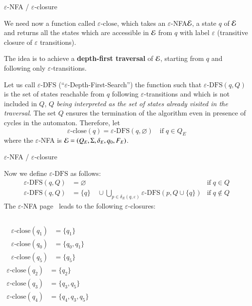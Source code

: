 \documentclass[compress,dvips,xcolor={dvipsnames},t]{beamer}
\newcommand\eNFA{\(\varepsilon\)-NFA\xspace}
\newcommand\eClose{\varepsilon\text{-close}}
\newcommand\eDFS{\varepsilon\text{-DFS}}
\begin{document}
%
\begin{frame}{\eNFA{} / \(\varepsilon\)-closure}

We need now a function called \textbf{\(\eClose\)}, which takes an
\eNFA \(\cal E\), a state \(q\) of \(\cal E\) and returns all the
states which are accessible in \(\cal E\) from \(q\) with label
\(\varepsilon\) (transitive closure of \(\varepsilon\) transitions).

\bigskip

The idea is to achieve a \textbf{depth-first traversal} of \(\cal E\),
starting from \(q\) and following only \(\varepsilon\)-transitions.

\bigskip

Let us call \(\eDFS\) (``\(\varepsilon\)-Depth-First-Search'') the
function such that \(\eDFS(q, Q)\) is the set of states reachable from
\(q\) following \(\varepsilon\)-transitions and which is not included in
\(Q\), \emph{\(Q\) being interpreted as the set of states already
  visited in the traversal}. The set \(Q\) ensures the termination of
the algorithm even in presence of cycles in the automaton. Therefore,
let
\[
\eClose (q) = \eDFS (q, \varnothing) \quad \text{if} \; q \in Q_E
\]
where the \eNFA is \({\cal E} = (Q_E, \Sigma, \delta_E, q_0, F_E)\).

\end{frame}

%
\begin{frame}{\eNFA{} / \(\varepsilon\)-closure}

Now we define \(\eDFS\) as follows:
\begin{align}
   \eDFS (q, Q)
&= \varnothing
& \text{if} \; q \in Q \label{eDFS_1}\\
  \eDFS (q, Q)
&= \{q\} \quad \cup \bigcup_{p \in \delta_E(q,\varepsilon)}{\eDFS (p, Q
    \cup \{q\})}
& \text{if} \; q \not\in Q \label{eDFS_2}
\end{align}
The \eNFA page~\pageref{enfa_num} leads to the
following \(\varepsilon\)-closures:

\bigskip

\begin{columns}
    \begin{align*}
      \eClose (q_1) &= \{q_1\}\\
      \eClose (q_0) &= \{q_0, q_1\}\\
      \eClose (q_5) &= \{q_5\}
    \end{align*}
  \begin{align*}
    \eClose (q_2) &= \{q_2\}\\
    \eClose (q_3) &= \{q_3, q_5\}\\
    \eClose (q_4) &= \{q_4, q_3, q_5\}
  \end{align*}
\end{columns}

\end{frame}
\end{document}
